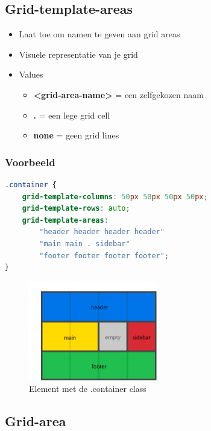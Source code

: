 \documentclass{article}
\newcommand{\bold}[1]{\textbf{#1}}
\begin{document}
\subsection{Grid-template-areas}

\begin{itemize}
    \item Laat toe om namen te geven aan grid areas
    \item Visuele representatie van je grid
    \item Values
    \begin{itemize}
        \item \bold{<grid-area-name>} =  een zelfgekozen naam
        \item \bold{.} = een lege grid cell
        \item \bold{none} = geen grid lines
    \end{itemize}
\end{itemize}

\subsubsection{Voorbeeld}

\begin{lstlisting}[language=CSS]
.container {
    grid-template-columns: 50px 50px 50px 50px;
    grid-template-rows: auto;
    grid-template-areas:
        "header header header header"
        "main main . sidebar"
        "footer footer footer footer";
}
\end{lstlisting}


\begin{figure}[H]
    \centering
    \includegraphics[width=0.5\textwidth]{grid-template-areas.png}
    \caption{Element met de .container class}
\end{figure}

\subsection{Grid-area}
\end{document}
